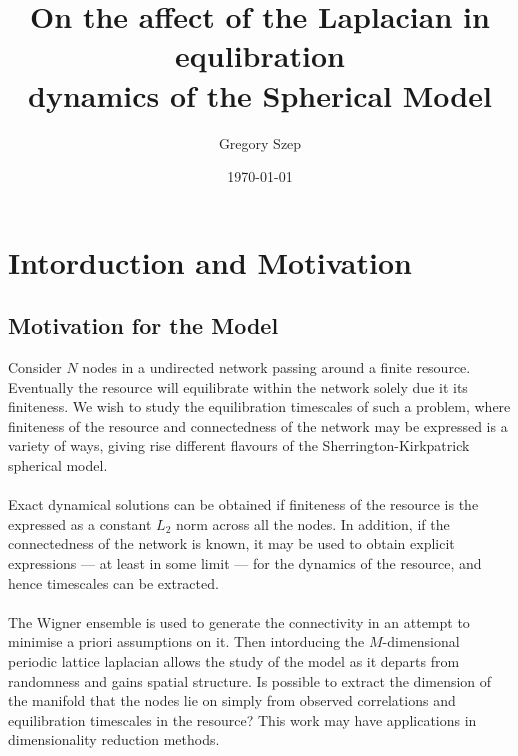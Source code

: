 \documentclass{article}[12pt]
\numberwithin{equation}{section}
\begin{document}
\title{
On the affect of the Laplacian in equlibration\\
dynamics of the Spherical Model
}

\author{Gregory Szep}
\date{\today}
\maketitle

\section{Intorduction and Motivation}
\subsection{Motivation for the Model}
Consider $N$ nodes in a undirected network passing around a finite resource.
Eventually the resource will equilibrate within the network solely due it its
finiteness. We wish to study the equilibration timescales of such a problem,
where finiteness of the resource and connectedness of the network may be
expressed is a variety of ways, giving rise different flavours of the
Sherrington-Kirkpatrick spherical model.
\\\\
Exact dynamical solutions can be obtained if finiteness of the resource
is the expressed as a constant $L_2$ norm across all the nodes. In addition,
if the connectedness of the network is known, it may be used to obtain explicit
expressions --- at least in some limit --- for the dynamics of the resource,
and hence timescales can be extracted.
\\\\
The Wigner ensemble is used to generate the connectivity in an attempt to
minimise a priori assumptions on it. Then intorducing the $M$-dimensional
periodic lattice laplacian allows the study of the model as it departs from
randomness and gains spatial structure. Is possible to extract the dimension
of the manifold that the nodes lie on simply from observed correlations and
equilibration timescales in the resource? This work may have applications in
dimensionality reduction methods.
\end{document}
